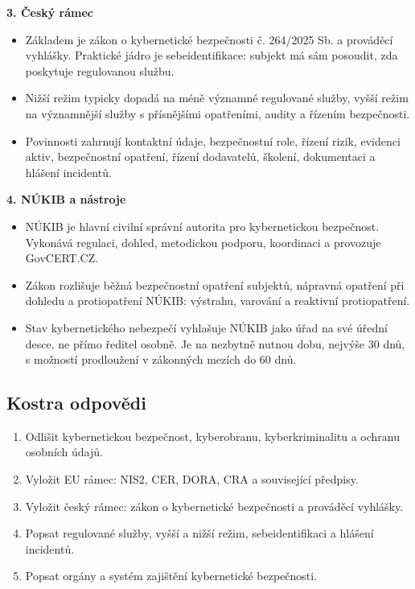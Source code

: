 \documentclass[11pt,a4paper]{article}
\begin{document}
\textbf{3. Český rámec}
\begin{itemize}
  \item Základem je zákon o kybernetické bezpečnosti č. 264/2025 Sb. a prováděcí vyhlášky. Praktické jádro je sebeidentifikace: subjekt má sám posoudit, zda poskytuje regulovanou službu.
  \item Nižší režim typicky dopadá na méně významné regulované služby, vyšší režim na významnější služby s přísnějšími opatřeními, audity a řízením bezpečnosti.
  \item Povinnosti zahrnují kontaktní údaje, bezpečnostní role, řízení rizik, evidenci aktiv, bezpečnostní opatření, řízení dodavatelů, školení, dokumentaci a hlášení incidentů.
\end{itemize}

\textbf{4. NÚKIB a nástroje}
\begin{itemize}
  \item NÚKIB je hlavní civilní správní autorita pro kybernetickou bezpečnost. Vykonává regulaci, dohled, metodickou podporu, koordinaci a provozuje GovCERT.CZ.
  \item Zákon rozlišuje běžná bezpečnostní opatření subjektů, nápravná opatření při dohledu a protiopatření NÚKIB: výstrahu, varování a reaktivní protiopatření.
  \item Stav kybernetického nebezpečí vyhlašuje NÚKIB jako úřad na své úřední desce, ne přímo ředitel osobně. Je na nezbytně nutnou dobu, nejvýše 30 dnů, s možností prodloužení v zákonných mezích do 60 dnů.
\end{itemize}

\subsection*{Kostra odpovědi}
\begin{enumerate}
  \item Odlišit kybernetickou bezpečnost, kyberobranu, kyberkriminalitu a ochranu osobních údajů.
  \item Vyložit EU rámec: NIS2, CER, DORA, CRA a související předpisy.
  \item Vyložit český rámec: zákon o kybernetické bezpečnosti a prováděcí vyhlášky.
  \item Popsat regulované služby, vyšší a nižší režim, sebeidentifikaci a hlášení incidentů.
  \item Popsat orgány a systém zajištění kybernetické bezpečnosti.
\end{enumerate}
\end{document}
